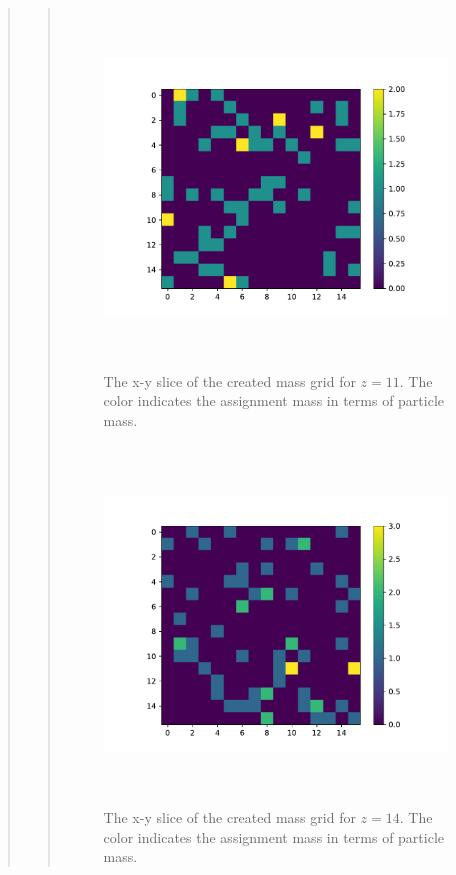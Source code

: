 \begin{quote}
\begin{quote}
\begin{figure}[!ht]
\centering
\includegraphics[width=14cm, height=9.5cm]{./Plots/5a_slice_11.pdf}
\caption{The x-y slice of the created mass grid for $z = 11$. The color indicates the assignment mass in terms of particle mass. }
\end{figure}
\newpage
\begin{figure}[!ht]
\centering
\includegraphics[width=14cm, height=9.5cm]{./Plots/5a_slice_14.pdf}
\caption{The x-y slice of the created mass grid for $z = 14$. The color indicates the assignment mass in terms of particle mass. }
\end{figure}
\end{quote}
\end{quote}











